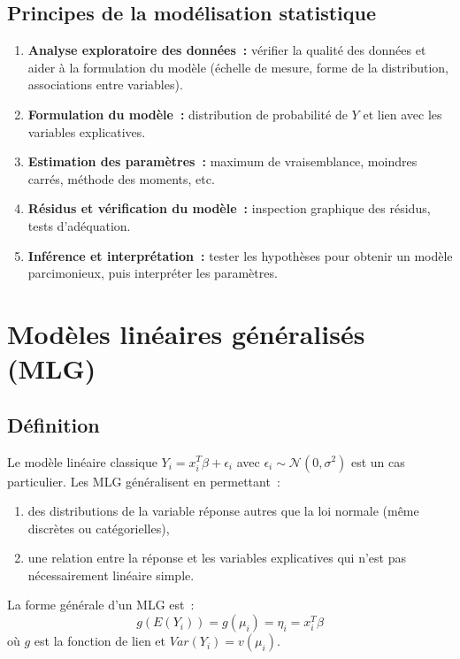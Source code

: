 \documentclass[11pt,letterpaper]{article}
\begin{document}
\subsection{Principes de la modélisation statistique}

\begin{enumerate}
\item \textbf{Analyse exploratoire des données~:} vérifier la qualité des données et aider à la formulation du modèle (échelle de mesure, forme de la distribution, associations entre variables).
\item \textbf{Formulation du modèle~:} distribution de probabilité de $Y$ et lien avec les variables explicatives.
\item \textbf{Estimation des paramètres~:} maximum de vraisemblance, moindres carrés, méthode des moments, etc.
\item \textbf{Résidus et vérification du modèle~:} inspection graphique des résidus, tests d'adéquation.
\item \textbf{Inférence et interprétation~:} tester les hypothèses pour obtenir un modèle parcimonieux, puis interpréter les paramètres.
\end{enumerate}

\newpage
\section{Modèles linéaires généralisés (MLG)}

\subsection{Définition}

Le modèle linéaire classique $Y_i = x_i^T \beta + \epsilon_i$ avec $\epsilon_i \sim \mathcal{N}(0,\sigma^2)$ est un cas particulier. Les MLG généralisent en permettant~:
\begin{enumerate}
\item des distributions de la variable réponse autres que la loi normale (même discrètes ou catégorielles),
\item une relation entre la réponse et les variables explicatives qui n'est pas nécessairement linéaire simple.
\end{enumerate}

La forme générale d'un MLG est~:
$$\boxed{g(E(Y_i)) = g(\mu_i) = \eta_i = x_i^T \beta}$$
où $g$ est la fonction de lien et $Var(Y_i) = v(\mu_i)$.
\end{document}
